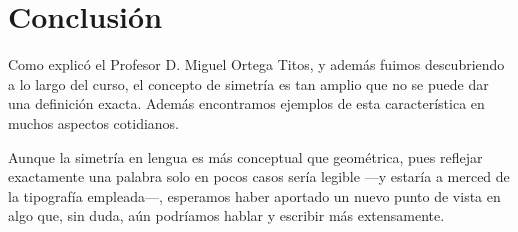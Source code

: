 \documentclass[10pt,a4paper]{article}
\begin{document}
	\section{Conclusión}
	
	Como explicó el Profesor D. Miguel Ortega Titos, y además fuimos descubriendo a lo largo del curso, el concepto de simetría es tan amplio que no se puede dar una definición exacta. Además encontramos ejemplos de esta característica en muchos aspectos cotidianos.
	
	Aunque la simetría en lengua es más conceptual que geométrica, pues reflejar exactamente una palabra solo en pocos casos sería legible ---y estaría a merced de la tipografía empleada---, esperamos haber aportado un nuevo punto de vista en algo que, sin duda, aún podríamos hablar y escribir más extensamente.
	
	
	\clearpage
	
	
	
\end{document}
